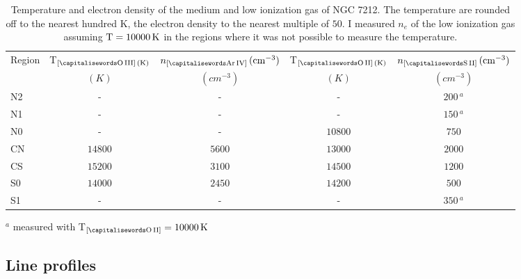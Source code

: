 \documentclass[../main.tex]{subfiles}
\begin{document}
\begin{table}
\caption[]{Temperature and electron density of the medium and low ionization gas of NGC 7212.
The temperature are rounded off to the nearest hundred K, the electron density to the nearest multiple of $50$. 
I measured $n_e$ of the low ionization gas assuming $\rm{T}=10000\,\si{K}$ in the regions where it was not possible to measure the temperature.}
\label{tab:ted_n}
\centering
\begin{threeparttable}
\begin{tabular}{lcccc}
\hline
Region&T$_{[\rm \ion{O}{III}]\,(\si{K})}$&$n_{[\rm \ion{Ar}{IV}]}\,(\si{cm^{-3}})$&T$_{[\rm \ion{O}{II}]\,(\si{K})}$&$n_{[\rm \ion{S}{II}]}\,(\si{cm^{-3}})$\\
&$(\si{K})$&$(\si{cm^{-3}})$&$(\si{K})$&$(\si{cm^{-3}})$\\
\hline
N2&-&-&-&$200\,^a$\\
N1&-&-&-&$150\,^a$\\
N0&-&-&$10800$&$750$\\
CN&$14800$&$5600$&$13000$&$2000$\\
CS&$15200$&$3100$&$14500$&$1200$\\
S0&$14000$&$2450$&$14200$&$500$\\
S1&-&-&-&$350\,^a$\\
\hline
\end{tabular}
\begin{tablenotes}
\item $^a$ measured with T$_{[\rm \ion{O}{II}]}= 10000\,\si{K}$
\end{tablenotes}
\end{threeparttable}
\end{table}

\subsection{Line profiles}
\label{sec:lineprof}
\end{document}
